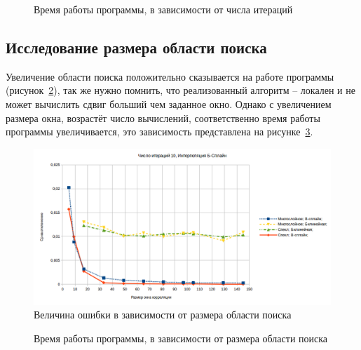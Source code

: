\begin{figure}[h!]
\caption{Время работы программы, в зависимости от числа итераций}
\label{pic:iter_time}
\end{figure}
\subsection{Исследование размера области поиска}

Увеличение области поиска положительно сказывается на работе программы (рисунок~\ref{fig:window_error}), так же нужно помнить, что реализованный алгоритм -- локален и не может вычислить сдвиг больший чем заданное окно. Однако с увеличением размера окна, возрастёт число вычислений, соответственно время работы программы увеличивается, это зависимость представлена на рисунке~\ref{pic:window_time}.
\begin{figure}
\centering
\includegraphics[width=0.9\linewidth]{images/window_error}
\caption{Величина ошибки в зависимости от размера области поиска}
\label{fig:window_error}
\end{figure}

\begin{figure}[h!]
\caption{Время работы программы, в зависимости от размера области поиска}
\label{pic:window_time}
\end{figure}
